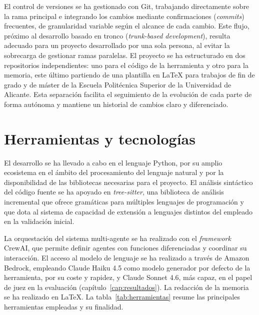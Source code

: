 El control de versiones se ha gestionado con Git, trabajando
directamente sobre la rama principal e integrando los cambios mediante
confirmaciones (\emph{commits}) frecuentes, de granularidad variable
según el alcance de cada cambio. Este flujo, próximo al desarrollo
basado en tronco (\emph{trunk-based development}), resulta adecuado para
un proyecto desarrollado por una sola persona, al evitar la sobrecarga
de gestionar ramas paralelas. El proyecto se ha estructurado en dos
repositorios independientes: uno para el código de la herramienta y otro
para la memoria, este último partiendo de una plantilla en \LaTeX{} para
trabajos de fin de grado y de máster de la Escuela Politécnica Superior
de la Universidad de Alicante. Esta separación facilita el seguimiento de la evolución de
cada parte de forma autónoma y mantiene un historial de cambios claro y
diferenciado.


\section{Herramientas y tecnologías}
\label{sec:herramientas-tecnologias}

El desarrollo se ha llevado a cabo en el lenguaje Python, por su amplio
ecosistema en el ámbito del procesamiento del lenguaje natural y por la
disponibilidad de las bibliotecas necesarias para el proyecto. El
análisis sintáctico del código fuente se ha apoyado en \emph{tree-sitter},
una biblioteca de análisis incremental que ofrece gramáticas para
múltiples lenguajes de programación y que dota al sistema de capacidad
de extensión a lenguajes distintos del empleado en la validación
inicial.

La orquestación del sistema multi-agente se ha realizado con el
\emph{framework} CrewAI, que permite definir agentes con funciones
diferenciadas y coordinar su interacción. El acceso al modelo de
lenguaje se ha realizado a través de Amazon Bedrock, empleando Claude
Haiku 4.5 como modelo generador por defecto de la herramienta, por su
coste y rapidez, y Claude Sonnet 4.6, más capaz, en el papel de juez en
la evaluación (capítulo~\ref{cap:resultados}). La
redacción de la memoria se ha realizado en \LaTeX. La
tabla~\ref{tab:herramientas} resume las principales herramientas
empleadas y su finalidad.

